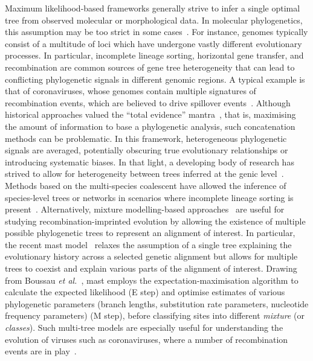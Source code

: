 Maximum likelihood-based frameworks generally strive to infer a single optimal tree from observed molecular or morphological data. In molecular phylogenetics, this assumption may be too strict in some cases~\cite{edwards2009, wong2024}. For instance, genomes typically consist of a multitude of loci which have undergone vastly different evolutionary processes. In particular, incomplete lineage sorting, horizontal gene transfer, and recombination are common sources of gene tree heterogeneity that can lead to conflicting phylogenetic signals in different genomic regions. A typical example is that of coronaviruses, whose genomes contain multiple signatures of recombination events, which are believed to drive spillover events~\cite{wells2023}. Although historical approaches valued the “total evidence” mantra~\cite{kluge1989}, that is, maximising the amount of information to base a phylogenetic analysis, such concatenation methods can be problematic. In this framework, heterogeneous phylogenetic signals are averaged, potentially obscuring true evolutionary relationships or introducing systematic biases. In that light, a developing body of research has strived to allow for heterogeneity between trees inferred at the genic level~\cite{edwards2009}. Methods based on the multi-species coalescent have allowed the inference of species-level trees or networks in scenarios where incomplete lineage sorting is present~\cite{rannala2003, mirarab2021, zhang2022}. Alternatively, mixture modelling-based approaches~\cite{pagel2005, boussau2009, crotty2019, wong2024} are useful for studying recombination-imprinted evolution by allowing the existence of multiple possible phylogenetic trees to represent an alignment of interest. In particular, the recent \gls{mast} model~\cite{wong2024} relaxes the assumption of a single tree explaining the evolutionary history across a selected genetic alignment but allows for multiple trees to coexist and explain various parts of the alignment of interest. Drawing from Boussau \textit{et al.}~\cite{boussau2009}, \gls{mast} employs the expectation-maximisation algorithm to calculate the expected likelihood (E step) and optimise estimates of various phylogenetic parameters (branch lengths, substitution rate parameters, nucleotide frequency parameters) (M step), before classifying sites into different \emph{mixture} (or \emph{classes}). Such multi-tree models are especially useful for understanding the evolution of viruses such as coronaviruses, where a number of recombination events are in play~\cite{wells2023}. 

